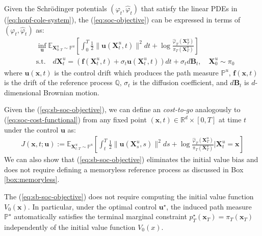 \documentclass{article}
\begin{document}
\begin{definition}\label{def:soc-sb-potential}
    Given the Schrödinger potentials $(\varphi_t, \hat{\varphi}_t)$ that satisfy the linear PDEs in (\ref{eq:hopf-cole-system}), the (\ref{eq:soc-objective}) can be expressed in terms of $(\varphi_t, \hat{\varphi}_t)$ as:
    \begin{align}
        &\inf_{\boldsymbol{u}}\mathbb{E}_{\boldsymbol{X}^u_{0:T}\sim \mathbb{P}^u}\left[\int_0^T\frac{1}{2}\|\boldsymbol{u}(\boldsymbol{X}^u_t,t)\|^2dt+\log \frac{\hat{\varphi}_T(\boldsymbol{X}^u_T)}{\pi_T(\boldsymbol{X}^u_T)}\right]\tag{SB-SOC Objective}\label{eq:sb-soc-objective}\\
        &\text{s.t.}\quad d\boldsymbol{X}^u_t=(\boldsymbol{f}(\boldsymbol{X}^u_t,t)+\sigma_t\boldsymbol{u}(\boldsymbol{X}^u_t,t))dt+\sigma_td\boldsymbol{B}_t, \quad \boldsymbol{X}^u_0\sim \pi_0\nonumber
    \end{align}
    where $\boldsymbol{u}(\boldsymbol{x},t)$ is the control drift which produces the path measure $\mathbb{P}^u$, $\boldsymbol{f}(\boldsymbol{x},t)$ is the drift of the reference process $\mathbb{Q}$, $\sigma_t$ is the diffusion coefficient, and $d\boldsymbol{B}_t$ is $d$-dimensional Brownian motion.
\end{definition}

Given the (\ref{eq:sb-soc-objective}), we can define an \textit{cost-to-go} analogously to (\ref{eq:soc-cost-functional}) from any fixed point $(\boldsymbol{x}, t)\in \mathbb{R}^d\times [0,T]$ at time $t$ under the control $\boldsymbol{u}$ as:
\begin{align}
    J(\boldsymbol{x},t;\boldsymbol{u}):=\mathbb{E}_{\boldsymbol{X}^u_{t:T}\sim \mathbb{P}^u}\left[\int_t^T\frac{1}{2}\|\boldsymbol{u}(\boldsymbol{X}^u_s,s)\|^2ds+\log \frac{\hat{\varphi}_T(\boldsymbol{X}^u_T)}{\pi_T(\boldsymbol{X}^u_T)}\bigg|\boldsymbol{X}^u_t=\boldsymbol{x}\right]\label{eq:sb-soc-cost-functional}
\end{align}
We can also show that (\ref{eq:sb-soc-objective}) eliminates the initial value bias and does not require defining a memoryless reference process as discussed in Box \ref{box:memoryless}.

\begin{proposition}\label{prop:initial-value-bias}
The (\ref{eq:sb-soc-objective}) does not require computing the initial value function $V_0(\boldsymbol{x})$. In particular, under the optimal control $\boldsymbol{u}^\star$, the induced path measure $\mathbb{P}^\star$ automatically satisfies the terminal marginal constraint $p_T^\star(\boldsymbol{x}_T)=\pi_T(\boldsymbol{x}_T)$ independently of the initial value function $V_0(x)$.
\end{proposition}
\end{document}
